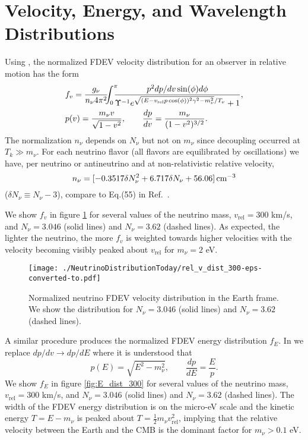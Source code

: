 \section{Velocity, Energy, and Wavelength Distributions}

Using , the normalized FDEV velocity distribution for an observer in relative motion has the form
\begin{align} \label{fvdistrib}
&f_v=\frac{g_\nu}{n_\nu 4\pi^2}\!\!\!\int_0^\pi \!\!\!\!\frac{ p^2dp/dv\sin(\phi) d\phi}{\Upsilon^{-1}e^{\sqrt{( E-v_{\text{rel}} p \cos(\phi))^2\gamma^2-m_\nu^2}/T_\nu}+1},\notag\\
&p(v)=\frac{m_\nu v}{\sqrt{1-v^2}},\qquad \frac{dp}{dv}=\frac{m_\nu}{(1-v^2)^{3/2}}.
\end{align}
The normalization $n_\nu$ depends on $N_\nu$ but not on $m_\nu$ since decoupling occurred at $T_k\gg m_\nu$. For each neutrino flavor (all flavors are equilibrated by oscillations) we have, per neutrino or antineutrino and at non-relativistic relative velocity,
\begin{equation}\label{nnu}
n_\nu=[-0.3517\delta N_\nu^2+6.717\delta N_\nu+56.06]\,{\rm cm}^{-3}
\end{equation}
($\delta N_\nu\equiv N_\nu-3$), compare to Eq.(55) in Ref.~\cite{Birrell:2013_2}.

We show $f_v$ in figure \ref{fig:rel_v_dist_300}   for several values of the neutrino mass, $v_{\text{rel}}=300$ km/s, and $N_\nu=3.046$ (solid lines) and $N_\nu=3.62$ (dashed lines). As expected, the lighter the neutrino, the more $f_v$  is weighted towards higher velocities with the velocity becoming visibly peaked about $v_{\text{rel}}$ for $m_\nu=2$ eV. 
\begin{figure}%
\centerline{\texttt{[image: ./NeutrinoDistributionToday/rel\_v\_dist\_300-eps-converted-to.pdf]}}
\caption{Normalized neutrino FDEV velocity distribution in the Earth frame. We show the distribution for $N_\nu=3.046$ (solid lines) and $N_\nu=3.62$ (dashed lines).}\label{fig:rel_v_dist_300}
 \end{figure}

A similar procedure produces the normalized FDEV energy distribution $f_E$.  In  we replace $dp/dv\to dp/dE$ where it is understood that 
\begin{equation}
p(E)=\sqrt{E^2-m_\nu^2},\qquad \frac{dp}{dE}=\frac{E}{p}.
\end{equation}
We show $f_E$ in figure \ref{fig:E_dist_300}  for several values of the neutrino mass, $v_{\text{rel}}=300$ km/s, and $N_\nu=3.046$ (solid lines) and $N_\nu=3.62$ (dashed lines). The width of the FDEV energy distribution is on the micro-eV scale and the kinetic energy $T=E-m_\nu$ is peaked about $T=\frac{1}{2}m_\nu v_{\text{rel}}^2$, implying that the relative velocity between the Earth and the CMB is the dominant factor for $m_\nu>0.1$ eV.

